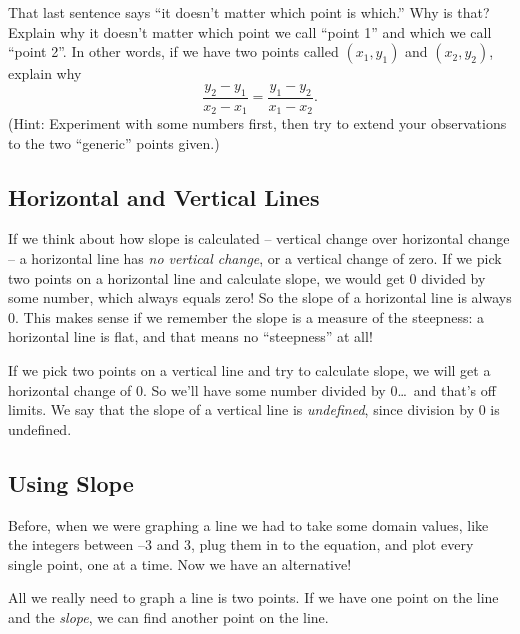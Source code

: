 \begin{boxeddef}
That last sentence says ``it doesn't matter which point is which.'' Why is that? Explain why it doesn't matter which point we call ``point 1'' and which we call ``point 2''. In other words, if we have two points called $(x_1, y_1)$ and $(x_2,y_2)$, explain why \[\frac{y_2 - y_1}{x_2 - x_1} = \frac{y_1 - y_2}{x_1 - x_2}.\] (Hint: Experiment with some numbers first, then try to extend your observations to the two ``generic'' points given.)
\end{boxeddef}

\subsection{Horizontal and Vertical Lines}

If we think about how slope is calculated -- vertical change over horizontal change -- a horizontal line has \textit{no vertical change}, or a vertical change of zero. If we pick two points on a horizontal line and calculate slope, we would get 0 divided by some number, which always equals zero! So the slope of a horizontal line is always 0. This makes sense if we remember the slope is a measure of the steepness: a horizontal line is flat, and that means no ``steepness'' at all!

If we pick two points on a vertical line and try to calculate slope, we will get a horizontal change of 0. So we'll have some number divided by 0\ldots\ and that's off limits. We say that the slope of a vertical line is \textit{undefined}, since division by 0 is undefined.

\subsection{Using Slope}

Before, when we were graphing a line we had to take some domain values, like the integers between $–3$ and $3$, plug them in to the equation, and plot every single point, one at a time. Now we have an alternative!

All we really need to graph a line is two points. If we have one point on the line and the \textit{slope}, we can find another point on the line.

